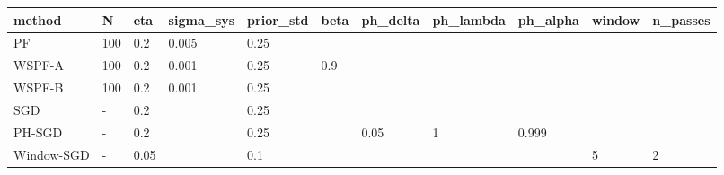 \begin{tabular}{lllllllllll}
\hline
method & N & eta & sigma\_sys & prior\_std & beta & ph\_delta & ph\_lambda & ph\_alpha & window & n\_passes \\
\hline
PF & 100 & 0.2 & 0.005 & 0.25 &  &  &  &  &  &  \\
WSPF-A & 100 & 0.2 & 0.001 & 0.25 & 0.9 &  &  &  &  &  \\
WSPF-B & 100 & 0.2 & 0.001 & 0.25 &  &  &  &  &  &  \\
SGD & - & 0.2 &  & 0.25 &  &  &  &  &  &  \\
PH-SGD & - & 0.2 &  & 0.25 &  & 0.05 & 1 & 0.999 &  &  \\
Window-SGD & - & 0.05 &  & 0.1 &  &  &  &  & 5 & 2 \\
\hline
\end{tabular}
